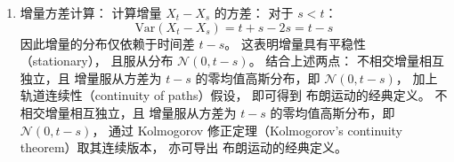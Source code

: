 \begin{parts}
\begin{xsolution}
\begin{enumerate}
       \[
       \text{Cov}(X_t - X_s, X_v - X_u) = \min(t,v) - \min(t,u) - \min(s,v) + \min(s,u)
       \]
       此式恒等于 0，证明了
       不相交时间段的增量是不不相关的（uncorrelated），进而由于是高斯向量（Gaussian vector）可知其相互独立。
    \item 增量方差计算：  
       计算增量 $X_t - X_s$ 的方差：
       对于 \(s < t\)：
       \[
       \text{Var}(X_t - X_s) = t + s - 2s = t - s
       \]
       因此增量的分布仅依赖于时间差 \(t-s\)。
       这表明增量具有平稳性（stationary），
       且服从分布 \(\mathcal{N}(0, t-s)\)。
    结合上述两点：
    不相交增量相互独立，且
    增量服从方差为 $t-s$ 的零均值高斯分布，即 \(\mathcal{N}(0, t-s)\)，
    加上轨道连续性（continuity of paths）假设，
    即可得到
    布朗运动的经典定义。
    不相交增量相互独立，且
    增量服从方差为 $t-s$ 的零均值高斯分布，即 \(\mathcal{N}(0, t-s)\)，
    通过 Kolmogorov 修正定理（Kolmogorov's continuity theorem）取其连续版本，
    亦可导出
    布朗运动的经典定义。
    \end{enumerate}
    \end{xsolution}


\end{parts}
